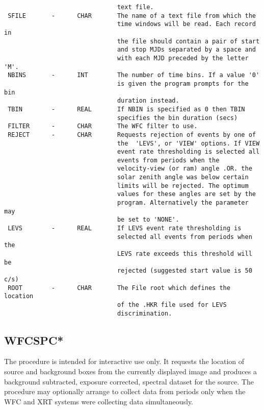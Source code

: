 \documentclass{book}
\renewcommand{\_}{{\tt\char'137}}     %
\begin{document}
\begin{verbatim}
                               text file.
 SFILE       -      CHAR       The name of a text file from which the
                               time windows will be read. Each record in
                               the file should contain a pair of start
                               and stop MJDs separated by a space and
                               with each MJD preceded by the letter 'M'.
 NBINS       -      INT        The number of time bins. If a value '0'
                               is given the program prompts for the bin
                               duration instead.
 TBIN        -      REAL       If NBIN is specified as 0 then TBIN
                               specifies the bin duration (secs)
 FILTER      -      CHAR       The WFC filter to use.
 REJECT      -      CHAR       Requests rejection of events by one of
                               the  'LEVS', or 'VIEW' options. If VIEW
                               event rate thresholding is selected all
                               events from periods when the
                               velocity-view (or ram) angle .OR. the
                               solar zenith angle was below certain
                               limits will be rejected. The optimum
                               values for these angles are set by the
                               program. Alternatively the parameter may
                               be set to 'NONE'.
 LEVS        -      REAL       If LEVS event rate thresholding is
                               selected all events from periods when the
                               LEVS rate exceeds this threshold will be
                               rejected (suggested start value is 50 c/s)
 ROOT        -      CHAR       The File root which defines the location
                               of the .HKR file used for LEVS
                               discrimination.
\end{verbatim}\subsection{WFCSPC*}
The procedure is intended for interactive use only. It requests the
location of source and background boxes from the currently displayed
image and produces a background subtracted, exposure corrected, spectral
dataset for the source.
The procedure may optionally arrange to collect data from periods only
when the WFC and XRT systems were collecting data simultaneously.
\end{document}
